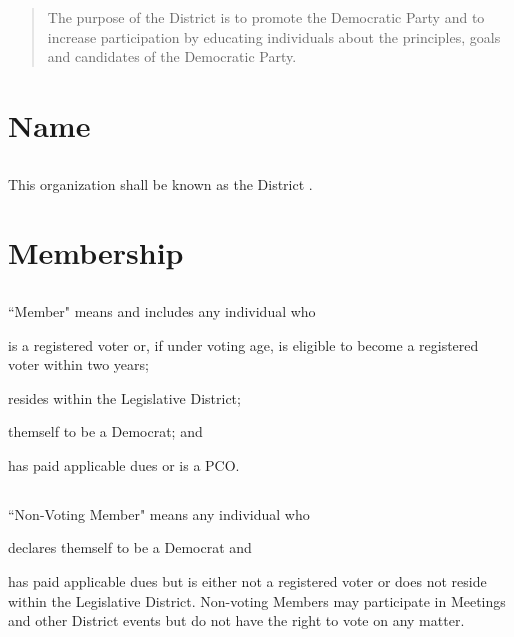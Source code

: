 \begin{abstract}
    The purpose of the \fortythird{} District  is to promote the Democratic Party and to increase participation by educating individuals about the principles, goals and candidates of the Democratic Party.
\end{abstract}

\section{Name}
\subsection{}
This organization shall be known as the \fortythird{} District .

\section{Membership}
\subsection{} \label{member}
``Member" means and includes any individual who
\begin{inlinealphalist}
    \item is a registered voter or, if under voting age, is eligible to become a registered voter within two years;
    \item resides within the \fortythird{} Legislative District;
    \item themself to be a Democrat; and
    \item has paid applicable dues or is a PCO.
\end{inlinealphalist}

\subsection{} \label{non-voting-member}
``Non-Voting Member" means any individual who
\begin{inlinealphalist}
    \item declares themself to be a Democrat and
    \item has paid applicable dues but is either not a registered voter or does not reside within the \fortythird{} Legislative District. Non-voting Members may participate in Meetings and other \fortythird{} District  events but do not have the right to vote on any matter.
\end{inlinealphalist}

